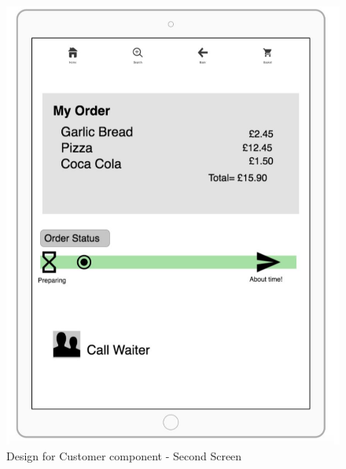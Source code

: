 \documentclass[11pt, a4paper]{report}
\begin{document}
\begin{figure}
\centering
\includegraphics[scale=0.5]{Figures/Customer2.png}
\caption{Design for Customer component - Second Screen}
\end{figure}

\printbibliography
\end{document}
